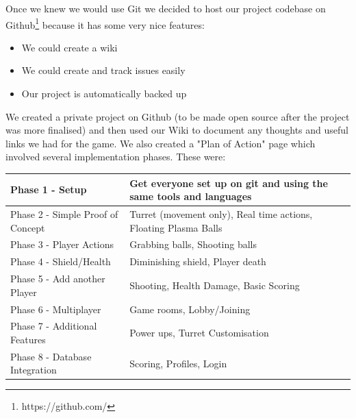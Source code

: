 \documentclass[a4wide, 11pt]{article}
\begin{document}
Once we knew we would use Git we decided to host our project codebase on Github\footnote{https://github.com/} because it has some very nice features:

  \begin{itemize}
    \item We could create a wiki
    \item We could create and track issues easily
    \item Our project is automatically backed up
  \end{itemize}

  We created a private project on Github (to be made open source after the project was more finalised) and then used our Wiki to document any thoughts and useful links we had for the game. We also created a "Plan of Action" page which involved several implementation phases. These were:
  

\begin{center}
  \begin{tabular}{ | l | l | }
    \hline
    
    Phase 1 - Setup & 
      Get everyone set up on git and using the same tools and languages \\
    \hline
    
    Phase 2 - Simple Proof of Concept & 
       Turret (movement only),
       Real time actions,
       Floating Plasma Balls \\
    \hline
    
    Phase 3 - Player Actions & 
       Grabbing balls,
       Shooting balls \\
    \hline
    
    Phase 4 - Shield/Health & 
       Diminishing shield,
       Player death \\
    \hline
    
    Phase 5 - Add another Player	 & 
       Shooting,
       Health Damage,
       Basic Scoring \\
    \hline
    
    Phase 6 - Multiplayer & 
      Game rooms,
      Lobby/Joining \\
    \hline
    
    Phase 7 - Additional Features & 
       Power ups,
       Turret Customisation \\
    \hline
    
    Phase 8 - Database Integration & 
       Scoring,
       Profiles,
       Login \\
    \hline
  \end{tabular}
\end{center}
\end{document}
